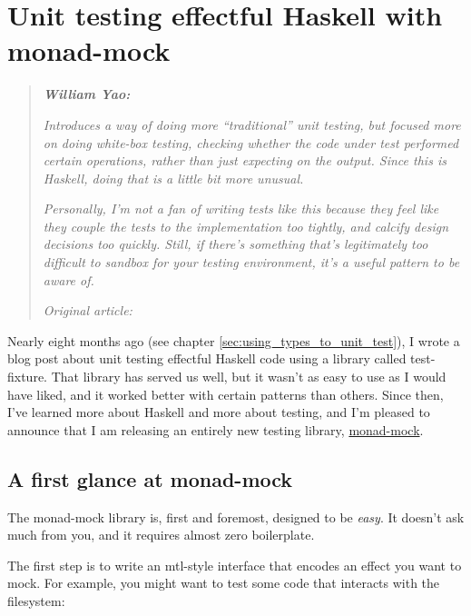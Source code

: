 \chapter{Unit testing effectful Haskell with monad-mock}

\begin{quotation}
\noindent\textit{\textbf{William Yao:}}

\textit{Introduces a way of doing more “traditional” unit testing, but focused more on doing white-box testing, checking whether the code under test performed certain operations, rather than just expecting on the output. Since this is Haskell, doing that is a little bit more unusual.}

\textit{Personally, I'm not a fan of writing tests like this because they feel like they couple the tests to the implementation too tightly, and calcify design decisions too quickly. Still, if there's something that's legitimately too difficult to sandbox for your testing environment, it's a useful pattern to be aware of.}

\vspace{\baselineskip}

\noindent\textit{Original article: \cite{unit_testing_monad_mock}}
\end{quotation}


\noindent Nearly eight months ago (see chapter \ref{sec:using_types_to_unit_test}),
I wrote a blog post about unit testing effectful Haskell code using a
library called test-fixture. That library has served us well, but it
wasn't as easy to use as I would have liked, and it worked better with
certain patterns than others. Since then, I've learned more about
Haskell and more about testing, and I'm pleased to announce that I am
releasing an entirely new testing library,
\href{https://hackage.haskell.org/package/monad-mock}{monad-mock}.

\section{A first glance at
monad-mock}\label{a-first-glance-at-monad-mock}

The monad-mock library is, first and foremost, designed to be
\emph{easy}. It doesn't ask much from you, and it requires almost zero
boilerplate.

The first step is to write an mtl-style interface that encodes an effect
you want to mock. For example, you might want to test some code that
interacts with the filesystem:

